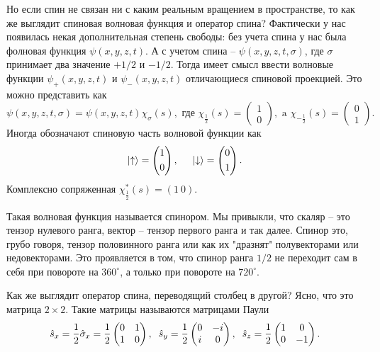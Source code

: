 Но если спин не связан ни с каким реальным вращением в пространстве, то как же выглядит спиновая волновая функция и оператор спина?
Фактически у нас появилась некая дополнительная степень свободы: без учета спина у нас была фолновая функция $\psi(x,y,z,t)$.
А с учетом спина -- $\psi(x,y,z,t,\sigma)$, где $\sigma$ принимает два значение $+1/2$ и $-1/2$. Тогда имеет смысл ввести волновые функции $\psi_+(x,y,z,t)$ и $\psi_-(x,y,z,t)$ отличающиеся спиновой проекцией.
Это можно представить как
\begin{equation*}
	\psi(x,y,z,t,\sigma) = \psi(x,y,z,t)\chi_\sigma(s),
	\text{ где }
	\chi_{\frac{1}{2}}(s) = \left(\begin{aligned}1 \\ 0\end{aligned}\right),
	\text{ a }
	\chi_{-\frac{1}{2}}(s) = \left(\begin{aligned}0 \\ 1\end{aligned}\right).
\end{equation*}
Иногда обозначают спиновую часть волновой функции как 
\begin{equation*}
	\left|\uparrow\right\rangle = \left(\begin{aligned}1 \\ 0\end{aligned}\right),
	\hspace{5 mm}
	\left|\downarrow\right\rangle = \left(\begin{aligned}0 \\ 1\end{aligned}\right).
\end{equation*}
Комплексно сопряженная $\chi_{\frac{1}{2}}^*(s) = (1 \ 0)$.

Такая волновая функция называется спинором.
Мы привыкли, что скаляр -- это тензор нулевого ранга, вектор -- тензор первого ранга и так далее.
Спинор это, грубо говоря, тензор половинного ранга или как их "дразнят" полувекторами или недовекторами.
Это проявляется в том, что спинор ранга $1/2$ не переходит сам в себя при повороте на $360^\circ$, а только при повороте на $720^\circ$.

Как же выглядит оператор спина, переводящий столбец в другой?
Ясно, что это матрица $2 \times 2$.
Такие матрицы называются матрицами Паули
\begin{equation*}
	\hat{s}_x = \frac{1}{2} \hat{\sigma}_x = \frac{1}{2} \begin{pmatrix}
	    0 & 1 \\
	    1 & 0 \\
	\end{pmatrix},
	\hspace{2 mm}
	\hat{s}_y = \frac{1}{2} \begin{pmatrix}
	    0 & -i \\
	    i & 0 \\
	\end{pmatrix},
	\hspace{2 mm}
	\hat{s}_z = \frac{1}{2} \begin{pmatrix}
	    1 & 0 \\
	    0 & -1 \\
	\end{pmatrix}.
\end{equation*}

